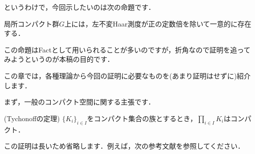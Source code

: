 というわけで，今回示したいのは次の命題です．
\begin{prop}[Haar測度の存在と一意性]\label{2}
局所コンパクト群$G$上には，左不変Haar測度が正の定数倍を除いて一意的に存在する．
\end{prop}
この命題はFactとして用いられることが多いのですが，折角なので証明を追ってみようというのが本稿の目的です．

この章では，各種理論から今回の証明に必要なものを(あまり証明はせずに)紹介します．

まず，一般のコンパクト空間に関する主張です．

\begin{thm}(Tychonoffの定理)\label{3}
$\{ K_i \} _{i \in I}$をコンパクト集合の族とするとき，$\prod_{i \in I} K_i$はコンパクト．
\end{thm}
この証明は長いため省略します．例えば，次の参考文献を参照してください．

